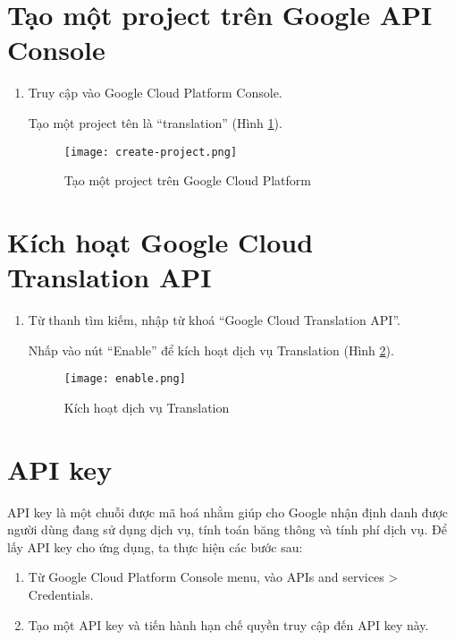 \documentclass[../thesis.tex]{subfiles}
\begin{document}
\section{Tạo một project trên Google API Console}

\begin{enumerate}
	\item Truy cập vào Google Cloud Platform Console.
	\begin{item}
	Tạo một project tên là ``translation'' (Hình \ref{Tao mot project tren Google Cloud Platform}).
	\begin{figure}
		\texttt{[image: create-project.png]}
		\caption{Tạo một project trên Google Cloud Platform}
		\label{Tao mot project tren Google Cloud Platform}
	\end{figure}
	\end{item}
\end{enumerate}

\section{Kích hoạt Google Cloud Translation API}
\begin{enumerate}
	\item Từ thanh tìm kiếm, nhập từ khoá ``Google Cloud Translation API''.
	\begin{item}
	Nhấp vào nút ``Enable'' để kích hoạt dịch vụ Translation (Hình \ref{Kich hoat dich vu Translation}).
	\begin{figure}
		\texttt{[image: enable.png]}
		\caption{Kích hoạt dịch vụ Translation}
		\label{Kich hoat dich vu Translation}
	\end{figure}
	\end{item}
\end{enumerate}

\section{API key}

API key là một chuỗi được mã hoá nhằm giúp cho Google nhận định danh được người dùng đang sử dụng dịch vụ, tính toán băng thông và tính phí dịch vụ. Để lấy API key cho ứng dụng, ta thực hiện các bước sau:

\begin{enumerate}
	\item Từ Google Cloud Platform Console menu, vào APIs and services > Credentials.
	\item Tạo một API key và tiến hành hạn chế quyền truy cập đến API key này.
\end{enumerate}
\end{document}
